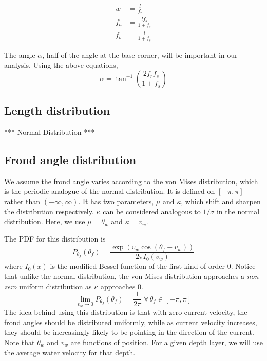 \begin{align}
	w &= \frac{l}{f_r} \\
	f_a &= \frac{lf_s}{1+f_s} \\
	f_b &= \frac{l}{1+f_s}
\end{align}

The angle $\alpha$, half of the angle at the base corner, will be important in our analysis.
Using the above equations,
\begin{equation}
	\alpha = \tan^{-1}\left(\frac{2f_rf_s}{1+f_s}\right)
\end{equation}

\subsection{Length distribution}

*** Normal Distribution ***
\subsection{Frond angle distribution}
\label{sec:angle_dist}
We assume the frond angle varies according to the von Mises distribution, which is the periodic analogue of the normal distribution.
It is defined on $[-\pi,\pi]$ rather than $(-\infty,\infty)$.
It has two parameters, $\mu$ and $\kappa$, which shift and sharpen the
distribution respectively.
$\kappa$ can be considered analogous to $1/\sigma$ in the normal distribution.
Here, we use $\mu = \theta_w$ and $\kappa = v_w$.

The PDF for this distribution is
\begin{equation}
	P_{\theta_f}(\theta_f) = \frac{\exp\left(v_w\cos(\theta_f-v_w)\right)}{2\pi I_0(v_w)}
\end{equation}
where $I_0(x)$ is the modified Bessel function of the first kind of order 0.
Notice that unlike the normal distribution, the von Mises distribution approaches a \textit{non-zero} uniform distribution as $\kappa$ approaches 0.
\begin{equation}
	\displaystyle \lim_{v_w \to 0}P_{\theta_f}(\theta_f) = \frac{1}{2\pi} \;\forall\, \theta_f \in [-\pi,\pi]
\end{equation}
The idea behind using this distribution is that with zero current velocity, the frond angles should be distributed uniformly, while as current velocity increases, they should be increasingly likely to be pointing in the direction of the current.
Note that $\theta_w$ and $v_w$ are functions of position.
For a given depth layer, we will use the average water velocity for that depth.

